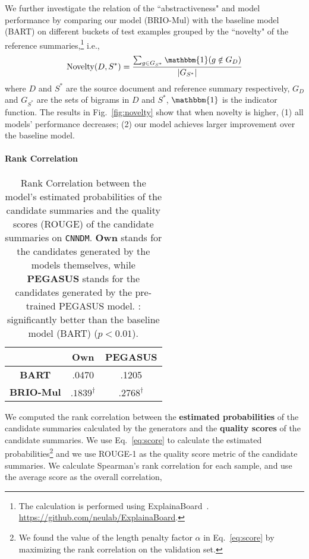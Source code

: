 \documentclass[11pt]{article}
\newcommand{\model}{BRIO\xspace}
\begin{document}
We further investigate the relation of the ``abstractiveness" and model performance by comparing our model (\model-Mul) with the baseline model (BART) on different buckets of test examples grouped by the ``novelty" of the reference summaries,\footnote{The calculation is performed using ExplainaBoard~\citep{liu-etal-2021-explainaboard}. \url{https://github.com/neulab/ExplainaBoard}.} i.e.,
\begin{equation}
\label{eq:novel}
\small
    \mathrm{Novelty}(D, S^*) = \frac{\sum_{g \in G_{S^*}}\mathbbm{1}(g \notin G_D)}{|G_{S^*}|} 
\end{equation}
where $D$ and $S^*$ are the source document and reference summary respectively, $G_D$ and $G_{S^*}$ are the sets of bigrams in $D$ and $S^*$, $\mathbbm{1}$ is the indicator function.
The results in Fig.~\ref{fig:novelty} show that when novelty is higher, (1) all models' performance decreases; (2) our model achieves larger improvement over the baseline model.





\paragraph{Rank Correlation}

\begin{table}[t!]
\centering
\small
\begin{tabular}{c|c|c}
\toprule
   & \textbf{Own} & \textbf{PEGASUS} \\
 \midrule
\textbf{BART} & .0470  & .1205  \\
\midrule
\textbf{\model-Mul} & $\mathbf{.1839}^\dag$  & $\mathbf{.2768}^\dag$ \\
\bottomrule
\end{tabular}
\caption{\label{tab:rank_correlation} Rank Correlation between the model's estimated probabilities of the candidate summaries and the quality scores (ROUGE) of the candidate summaries on \texttt{CNNDM}.
\textbf{Own} stands for the candidates generated by the models themselves, while \textbf{PEGASUS} stands for the candidates generated by the pre-trained PEGASUS model.
\dag: significantly better than the baseline model (BART) ($p < 0.01$).
}
\end{table}

We computed the rank correlation between the \textbf{estimated probabilities} of the candidate summaries calculated by the generators and the \textbf{quality scores} of the candidate summaries. 
We use Eq.~\ref{eq:score} to calculate the estimated probabilities\footnote{We found the value of the length penalty factor $\alpha$ in Eq.~\ref{eq:score} by maximizing the rank correlation on the validation set.} and we use ROUGE-1 as the quality score metric of the candidate summaries.
We calculate Spearman's rank correlation for each sample, and use the average score as the overall correlation, 
\end{document}
